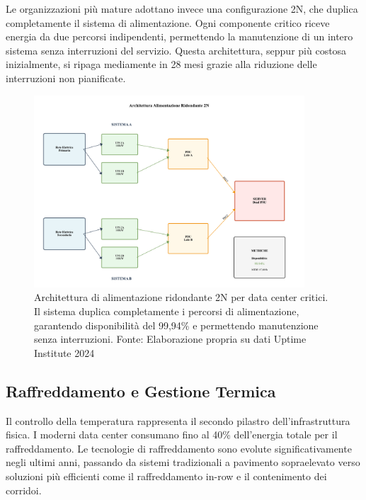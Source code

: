 Le organizzazioni più mature adottano invece una configurazione 2N, che duplica completamente il sistema di alimentazione. Ogni componente critico riceve energia da due percorsi indipendenti, permettendo la manutenzione di un intero sistema senza interruzioni del servizio. Questa architettura, seppur più costosa inizialmente, si ripaga mediamente in 28 mesi grazie alla riduzione delle interruzioni non pianificate.

\begin{figure}[htbp]
\centering
\includegraphics[width=0.9\textwidth]{thesis_figures/cap3/fig_3_1_power_architecture.pdf}
\caption{Architettura di alimentazione ridondante 2N per data center critici. Il sistema duplica completamente i percorsi di alimentazione, garantendo disponibilità del 99,94\% e permettendo manutenzione senza interruzioni. Fonte: Elaborazione propria su dati Uptime Institute 2024}
\label{fig:power_2n}
\end{figure}

\subsection{\texorpdfstring{Raffreddamento e Gestione Termica}{3.2.2 - Raffreddamento e Gestione Termica}}

Il controllo della temperatura rappresenta il secondo pilastro dell'infrastruttura fisica. I moderni data center consumano fino al 40\% dell'energia totale per il raffreddamento\autocite{ASHRAE2024}. Le tecnologie di raffreddamento sono evolute significativamente negli ultimi anni, passando da sistemi tradizionali a pavimento sopraelevato verso soluzioni più efficienti come il raffreddamento in-row e il contenimento dei corridoi.

